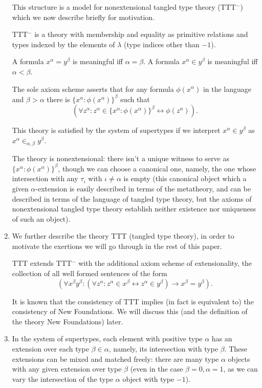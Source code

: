 \documentclass[12pt]{article}
\begin{document}
\begin{enumerate}
This structure is a model for nonextensional tangled type theory (TTT$^-$) which we now describe briefly for motivation.

TTT$^-$ is a theory with membership and equality as primitive relations and types indexed by the elements of $\lambda$ (type indices other than $-1$).

A formula $x^\alpha = y^\beta$ is meaningful iff $\alpha=\beta$.  A formula $x^\alpha \in y^\beta$ is meaningful iff $\alpha<\beta$.

The sole axiom scheme asserts that for any formula $\phi(x^\alpha)$ in the language and $\beta>\alpha$ there is $\{x^\alpha:\phi(x^\alpha)\}^\beta$ such that
$$(\forall z^\alpha:z^\alpha \in \{x^\alpha:\phi(x^\alpha)\}^\beta \leftrightarrow \phi(z^\alpha)).$$

This theory is satisfied by the system of supertypes if we interpret $x^\alpha \in y^\beta$ as $x^\alpha \in_{\alpha,\beta} y^\beta$.

The theory is nonextensional:  there isn't a unique witness to serve as $\{x^\alpha:\phi(x^\alpha)\}^\beta$, though we can choose a canonical one, namely, the one whose intersection
with any $\tau_\iota$ with $\iota \neq \alpha$ is empty (this canonical object which a given $\alpha$-extension is easily described in terms of the metatheory, and can be described in terms of the language of tangled type theory, but the axioms of nonextensional tangled type theory establish neither existence nor uniqueness of such an object).

\item We further describe the theory TTT (tangled type theory), in order to motivate the exertions we will go through in the rest of this paper.

TTT extends TTT$^-$ with the additional axiom scheme of extensionality, the collection of all well formed sentences of the form $$(\forall x^\beta y^\beta:(\forall z^\alpha:z^\alpha \in x^\beta \leftrightarrow z^\alpha \in y^\beta)\rightarrow x^\beta=y^\beta).$$

It is known that the consistency of TTT implies (in fact is equivalent to) the consistency of New Foundations.  We will discuss this (and the definition of the theory New Foundations)  later.

\item In the system of supertypes, each element with positive type $\alpha$ has an extension over each type $\beta\in \alpha$, namely, its intersection with type $\beta$.  These extensions can be mixed and matched freely:  there are many type $\alpha$ objects with any given extension over type $\beta$ (even in the case $\beta=0, \alpha=1$, as we can vary the intersection of
the type $\alpha$ object with type $-1$).


\end{enumerate}
\end{document}
